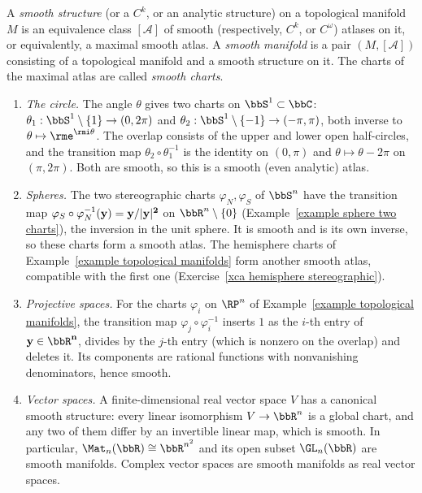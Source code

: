 \begin{defn}
    A \emph{smooth structure} (or a $C^k$, or an analytic structure) on a topological manifold $M$ is an equivalence class $[\mathcal{A}]$ of smooth (respectively, $C^k$, or $C^\omega$) atlases on it, or equivalently, a maximal smooth atlas. A \emph{smooth manifold} is a pair $(M,[\mathcal{A}])$ consisting of a topological manifold and a smooth structure on it. The charts of the maximal atlas are called \emph{smooth charts}.
\end{defn}

\begin{example}\label{example smooth atlases}
    \begin{enumerate}
        \item \emph{The circle.} The angle $\theta$ gives two charts on $\bbS^1\subset\bbC$: $\theta_1:\bbS^1\setminus\{1\}\to(0,2\pi)$ and $\theta_2:\bbS^1\setminus\{-1\}\to(-\pi,\pi)$, both inverse to $\theta\mapsto\rme^{\rmi\theta}$. The overlap consists of the upper and lower open half-circles, and the transition map $\theta_2\circ\theta_1^{-1}$ is the identity on $(0,\pi)$ and $\theta\mapsto\theta-2\pi$ on $(\pi,2\pi)$. Both are smooth, so this is a smooth (even analytic) atlas.
        \item \emph{Spheres.} The two stereographic charts $\varphi_N,\varphi_S$ of $\bbS^n$ have the transition map $\varphi_S\circ\varphi_N^{-1}(\bf{y})=\bf{y}/\lvert\bf{y}\rvert^2$ on $\bbR^n\setminus\{0\}$ (Example~\ref{example sphere two charts}), the inversion in the unit sphere. It is smooth and is its own inverse, so these charts form a smooth atlas. The hemisphere charts of Example~\ref{example topological manifolds} form another smooth atlas, compatible with the first one (Exercise~\ref{xca hemisphere stereographic}).
        \item \emph{Projective spaces.} For the charts $\varphi_i$ on $\RP^n$ of Example~\ref{example topological manifolds}, the transition map $\varphi_j\circ\varphi_i^{-1}$ inserts $1$ as the $i$-th entry of $\bf{y}\in\bbR^n$, divides by the $j$-th entry (which is nonzero on the overlap) and deletes it. Its components are rational functions with nonvanishing denominators, hence smooth.
        \item \emph{Vector spaces.} A finite-dimensional real vector space $V$ has a canonical smooth structure: every linear isomorphism $V\to\bbR^n$ is a global chart, and any two of them differ by an invertible linear map, which is smooth. In particular, $\Mat_n(\bbR)\cong\bbR^{n^2}$ and its open subset $\GL_n(\bbR)$ are smooth manifolds. Complex vector spaces are smooth manifolds as real vector spaces.

\end{enumerate}
\end{example}
